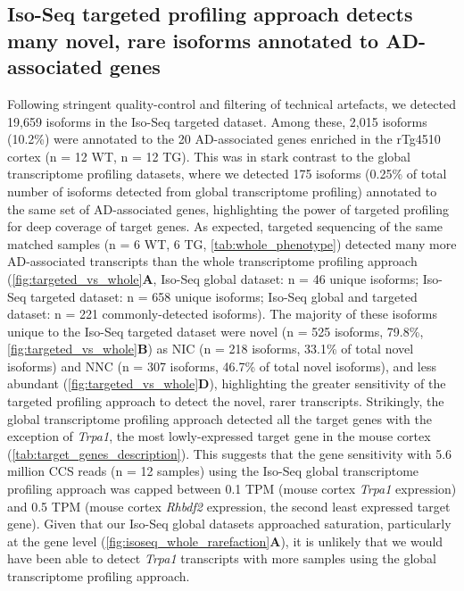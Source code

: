 \newpage
\subsection{Iso-Seq targeted profiling approach detects many novel, rare isoforms annotated to AD-associated genes}
\label{ch6: wholevstargeted}
Following stringent quality-control and filtering of technical artefacts, we detected 19,659 isoforms in the Iso-Seq targeted dataset. Among these, 2,015 isoforms (10.2\%) were annotated to the 20 AD-associated genes enriched in the rTg4510 cortex (n = 12 WT, n = 12 TG). This was in stark contrast to the global transcriptome profiling datasets, where we detected 175 isoforms (0.25\% of total number of isoforms detected from global transcriptome profiling) annotated to the same set of AD-associated genes, highlighting the power of targeted profiling for deep coverage of target genes. As expected, targeted sequencing of the same matched samples (n = 6 WT, 6 TG, \cref{tab:whole_phenotype}) detected many more AD-associated transcripts than the whole transcriptome profiling approach (\cref{fig:targeted_vs_whole}\textbf{A}, Iso-Seq global dataset: n = 46 unique isoforms; Iso-Seq targeted dataset: n = 658 unique isoforms; Iso-Seq global and targeted dataset: n = 221 commonly-detected isoforms). The majority of these isoforms unique to the Iso-Seq targeted dataset were novel (n = 525 isoforms, 79.8\%, \cref{fig:targeted_vs_whole}\textbf{B}) as NIC (n = 218 isoforms, 33.1\% of total novel isoforms) and NNC (n = 307 isoforms, 46.7\% of total novel isoforms), and less abundant (\cref{fig:targeted_vs_whole}\textbf{D}), highlighting the greater sensitivity of the targeted profiling approach to detect the novel, rarer transcripts. Strikingly, the global transcriptome profiling approach detected all the target genes with the exception of \textit{Trpa1}, the most lowly-expressed target gene in the mouse cortex (\cref{tab:target_genes_description}). This suggests that the gene sensitivity with 5.6 million CCS reads (n = 12 samples) using the Iso-Seq global transcriptome profiling approach was capped between 0.1 TPM (mouse cortex \textit{Trpa1} expression) and 0.5 TPM (mouse cortex \textit{Rhbdf2} expression, the second least expressed target gene). Given that our Iso-Seq global datasets approached saturation, particularly at the gene level (\cref{fig:isoseq_whole_rarefaction}\textbf{A}), it is unlikely that we would have been able to detect \textit{Trpa1} transcripts with more samples using the global transcriptome profiling approach.

